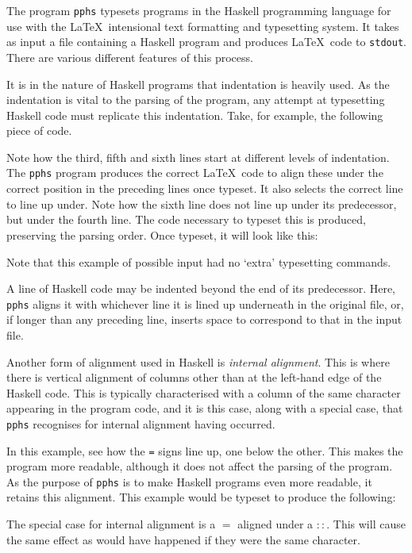 
The program {\tt pphs} typesets programs in the Haskell programming
language for use with the \LaTeX\ intensional text formatting
and typesetting system.  It takes
as input a file containing a Haskell program and produces \LaTeX\
code to {\tt stdout}.  There are various different features of this
process.


It is in the nature of Haskell programs that indentation is heavily used.  As the
indentation is vital to the parsing of the program, any attempt at typesetting
Haskell code must replicate this indentation.  Take, for example, the following piece of code.
\begin{quote}

\end{quote}
Note how the third, fifth and sixth lines start at different levels of indentation.
The {\tt pphs} program produces the correct \LaTeX\ code to align these under the
correct position in the preceding lines once typeset.  It also selects the correct
line to line up under.  Note how the sixth line does not line up
under its predecessor, but under the fourth line.
The code necessary to typeset this is produced, preserving the parsing
order.  Once typeset, it will look like this:
\begin{quote}

\end{quote}
Note that this
example of possible input had no `extra' typesetting commands.

A line of Haskell code may be indented beyond the end of its predecessor.
Here, {\tt pphs} aligns it with whichever line it is lined up underneath in the
original file, or, if longer than any preceding line, inserts space to correspond
to that in the input file.


Another form of alignment used in Haskell is {\em internal alignment}.  This is where
there is vertical alignment of columns other than at the left-hand edge of the
Haskell code.  This is typically characterised with a column of the same character
appearing in the program code, and it is this case, along with a
special case, that {\tt pphs} recognises for internal alignment having occurred.
\begin{quote}

\end{quote}
In this example, see how the {\tt =} signs line up, one below the other.  This makes
the program more readable, although it does not affect the parsing of the program.
As the purpose of {\tt pphs} is to make Haskell programs even more readable, it
retains this alignment.  This example would be typeset to produce the following:
\begin{quote}

\end{quote}
The special case for internal alignment is a $=$ aligned under a $::$.
This will cause the same effect as would have happened if they were the same
character.

